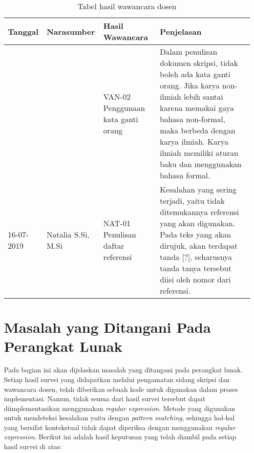 \begin{table}[H]
	\renewcommand{\arraystretch}{1.5}
	\caption {Tabel hasil wawancara dosen} \label{tab:hasil_wawancara3}
	\begin{center}
		\begin{tabular}{|p{2 cm}|>{\raggedright} p{3.5 cm}| p{4 cm}| p{5 cm}|}
		\hline
		Tanggal & Narasumber & Hasil Wawancara & Penjelasan \\ 
		\hline
		 & & VAN-02 \newline Penggunaan kata ganti orang & Dalam penulisan dokumen skripsi, tidak boleh ada kata ganti orang. Jika karya non-ilmiah lebih santai karena memakai gaya bahasa non-formal, maka berbeda dengan karya ilmiah. Karya ilmiah memiliki aturan baku dan menggunakan bahasa formal.  \newline \\ 		
		 \hline
		16-07-2019 & Natalia S.Si, M.Si & NAT-01 \newline Penulisan daftar referensi & Kesalahan yang sering terjadi, yaitu tidak ditemukannya referensi yang akan digunakan. Pada teks yang akan dirujuk, akan terdapat tanda [?], seharusnya tanda tanya tersebut diisi oleh nomor dari referensi. \newline \\ 
		\hline
		\end{tabular}
	\end{center}
\end{table}

\section{Masalah yang Ditangani Pada Perangkat Lunak}

Pada bagian ini akan dijelaskan masalah yang ditangani pada perangkat lunak. Setiap hasil survei yang didapatkan melalui pengamatan sidang skripsi dan wawancara dosen, telah diberikan sebuah kode untuk digunakan dalam proses implementasi. Namun, tidak semua dari hasil survei tersebut dapat diimplementasikan menggunakan \textit{regular expression}. Metode yang digunakan untuk mendeteksi kesalahan yaitu dengan \textit{pattern matching}, sehingga hal-hal yang bersifat kontekstual tidak dapat diperiksa dengan menggunakan \textit{regular expression}. Berikut ini adalah hasil keputusan yang telah diambil pada setiap hasil survei di atas:

